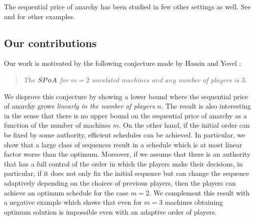 \documentclass[runningheads]{llncs}
\newcommand{\SPoA}{\textbf{SPoA}\xspace}
\begin{document}
The sequential price of anarchy has been studied in few other settings as well. See \cite{originalSPOA} and \cite{SPOAcongestion} for other examples.

\subsection{Our contributions}\label{sec:contributions}

Our work is motivated by the following conjecture made by Hassin and Yovel \cite{Hassin}: 
\begin{quote}
	\emph{The \SPoA for  $m=2$ unrelated machines and any number of players is $3$.}
\end{quote}
We disprove this conjecture by showing a lower bound where the sequential price of anarchy grows \emph{linearly in the number of players $n$}. 
%
The result is also interesting in the sense that there is no upper bound on the sequential price of anarchy as a function of the number of machines $m$. 
%
On the other hand, if the initial order can be fixed by some authority, efficient schedules can be achieved. 
%
In particular, we show that a large class of sequences result in a schedule which is at most linear factor worse than the optimum.
%
Moreover, if we assume that there is an authority that has a full control of the order in which the players make their decisions,  in particular, if it does not only fix the initial sequence but can change the sequence adaptively depending on the choices of previous players, then the players can achieve an optimum schedule for the case $m=2$.
%
We complement this result with a negative example which shows that even for $m=3$ machines obtaining optimum solution is impossible even with an adaptive order of players. 
\end{document}
